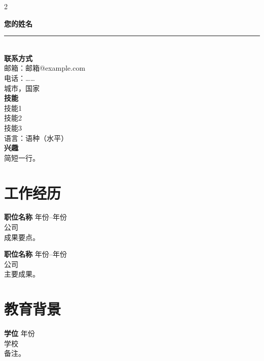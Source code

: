\documentclass[11pt,a4paper]{article}
\begin{document}
\begin{paracol}{2}

\setlength{\parindent}{0pt}
{\large \textbf{您的姓名}}\\[0.2em]
\rule{\linewidth}{2.2cm}\\[0.5em]
\textbf{联系方式}\\
邮箱：邮箱@example.com\\
电话：……\\
城市，国家\\[0.6em]
\textbf{技能}\\
技能1\\
技能2\\
技能3\\
语言：语种（水平）\\[0.6em]
\textbf{兴趣}\\
简短一行。

\switchcolumn

\section*{工作经历}
\textbf{职位名称} \hfill 年份--年份 \\
公司 \\
成果要点。

\textbf{职位名称} \hfill 年份--年份 \\
公司 \\
主要成果。

\section*{教育背景}
\textbf{学位} \hfill 年份 \\
学校 \\
备注。

\end{paracol}
\end{document}
